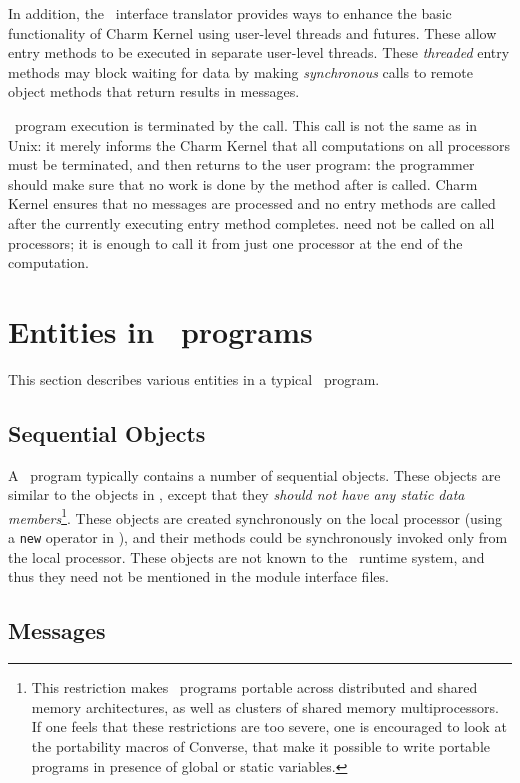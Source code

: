 In addition, the \charmpp\ interface translator provides ways to enhance the
basic functionality of Charm Kernel using user-level threads and futures. These
allow entry methods to be executed in separate user-level threads.  These
 {\em threaded} entry methods may block waiting for data by
making {\em synchronous} calls to remote object methods that return results in
messages.

\charmpp\ program execution is terminated by the  call. This call is
not the same as in Unix: it merely informs the Charm Kernel that all
computations on all processors must be terminated, and then returns to the user
program: the programmer should make sure that no work is done by the method
after  is called.  Charm Kernel ensures that no messages are
processed and no entry methods are called after the currently executing entry
method completes.  need not be called on all processors; it is
enough to call it from just one processor at the end of the computation.

\section{Entities in \charmpp\ programs}

This section describes various entities in a typical \charmpp\ program.

\subsection{Sequential Objects}

A \charmpp\ program typically contains a number of sequential objects. These
objects are similar to the objects in \CC, except that they {\em should not
have any static data members}\footnote{ This restriction makes \charmpp\
programs portable across distributed and shared memory architectures, as well
as clusters of shared memory multiprocessors. If one feels that these
restrictions are too severe, one is encouraged to look at the portability
macros of Converse, that make it possible to write portable programs in
presence of global or static variables.}. These objects are created
synchronously on the local processor (using a {\tt new} operator in \CC), and
their methods could be synchronously invoked only from the local processor.
These objects are not known to the \charmpp\ runtime system, and thus they need
not be mentioned in the module interface files.

\subsection{Messages}

